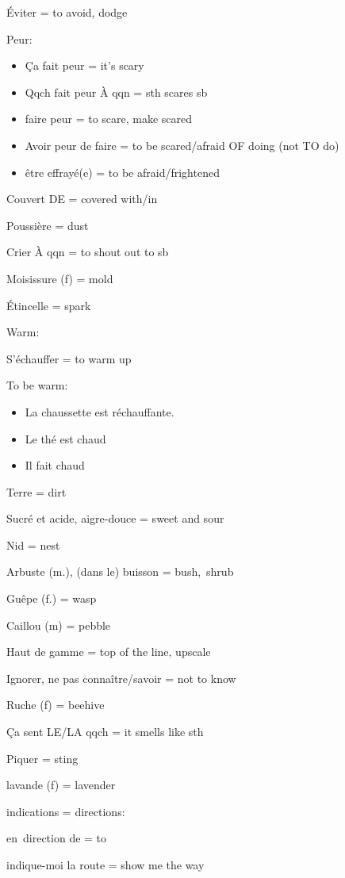 Éviter = to avoid, dodge

Peur:

\begin{itemize}
\item
  Ça fait peur = it's scary~
\item
  Qqch fait peur {À} qqn = sth scares sb
\item
  faire peur = to scare, make scared
\item
  {Avoir peur de faire = to be scared/afraid} {OF} {doing (not TO do)}
\item
  {être effrayé(e) = to be afraid/frightened}
\end{itemize}

Couvert DE = covered with/in

Poussière = dust~

Crier À qqn = to shout out to sb

Moisissure (f) = mold

Étincelle = spark

Warm:

S'échauffer = to warm up

To be warm:

\begin{itemize}
\item
  La chaussette est {réchauffante}.
\item
  Le thé est chaud~
\item
  Il fait chaud~
\end{itemize}

Terre = dirt

Sucré et acide, aigre-douce = sweet and sour~

Nid = nest

Arbuste (m.), ({dans} le) buisson = bush,~shrub

Guêpe (f.) = wasp

Caillou (m) = pebble~

Haut de gamme = top of the line, upscale~

Ignorer, ne pas connaître/savoir = not to know

Ruche (f) = beehive~

Ça sent LE/LA qqch = it smells like sth

Piquer = sting

lavande (f) = lavender~

indications = directions:

en~direction de = to

indique-moi la route = show me the way

